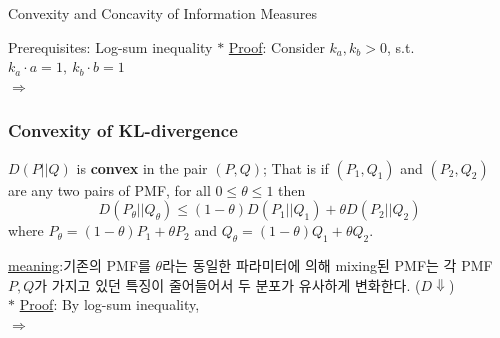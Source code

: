 \documentclass[9pt]{beamer}
\begin{document}
\begin{section}{Convexity and Concavity of Information Measures}
\begin{frame}{Prerequisites: Log-sum inequality}
            $\ast$ \underline{Proof}:
            Consider $k_a, k_b > 0$, s.t. $k_a \cdot a = 1,\ k_b \cdot b = 1$ \\ 
            $\Rightarrow$ 
            \vspace{3cm}
        \end{frame}
    
        \begin{frame}
            \frametitle{Convexity of KL-divergence}
            \begin{theorem}
                $D(P||Q)$ is \textbf{convex} in the pair $(P, Q)$;
                That is if $(P_1, Q_1)$ and $(P_2, Q_2)$ are any \alert{two pairs of PMF}, for all $0 \le \theta \le 1$ then 
                $$ D(P_\theta||Q_\theta) \le (1-\theta) D(P_1 || Q_1) + \theta D(P_2 || Q_2)$$
                where $P_\theta = (1-\theta) P_1 + \theta P_2$ and $Q_\theta = (1-\theta) Q_1 + \theta Q_2$.
            \end{theorem}
            \checkmark \underline{meaning}:기존의 PMF를 $\theta$라는 동일한 파라미터에 의해 mixing된 PMF는 각 PMF $P, Q$가 가지고 있던 특징이 줄어들어서 두 분포가 유사하게 변화한다. ($D \Downarrow$)
            \vspace{0.2cm}
            \\$\ast$ \underline{Proof}: By log-sum inequality,
            \\$\Rightarrow$
            \vspace{3cm}
        \end{frame}


\end{section}
\end{document}
